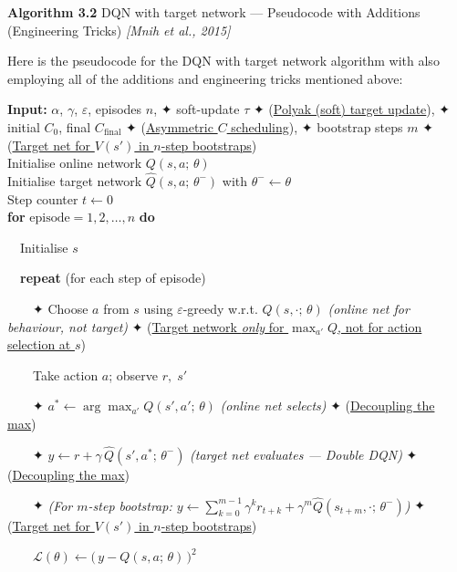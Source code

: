\documentclass[11pt]{article}
\begin{document}
    \begin{pseudobox}

\textbf{Algorithm 3.2} DQN with target network --- Pseudocode with
Additions (Engineering Tricks) \emph{{[}Mnih et al., 2015{]}}

\tcbline

Here is the pseudocode for the DQN with target network algorithm with
also employing all of the additions and engineering tricks mentioned
above:

\textbf{Input:} \(\alpha\), \(\gamma\), \(\varepsilon\), episodes \(n\),
✦ soft-update \(\tau\) ✦ (\hyperref[trick-3-2-1]{Polyak (soft) target
update}), ✦ initial \(C_0\), final \(C_\text{final}\) ✦
(\hyperref[trick-3-2-3]{Asymmetric \(C\) scheduling}), ✦ bootstrap steps
\(m\) ✦ (\hyperref[trick-3-2-5]{Target net for \(V(s')\) in \(n\)-step
bootstraps})\\
Initialise online network \(Q(s, a;\, \theta)\)\\
Initialise target network \(\hat{Q}(s, a;\, \theta^{-})\) with
\(\theta^{-} \leftarrow \theta\)\\
Step counter \(t \leftarrow 0\)\\
\textbf{for} \(\text{episode} = 1, 2, \ldots, n\) \textbf{do}\\
\strut ~~Initialise \(s\)\\
\strut ~~\textbf{repeat} (for each step of episode)\\
\strut ~~~~✦ Choose \(a\) from \(s\) using \(\varepsilon\)-greedy w.r.t.
\(Q(s, \cdot;\, \theta)\) \emph{(online net for behaviour, not target)}
✦ (\hyperref[trick-3-2-2]{Target network \emph{only} for
\(\max_{a'} Q\), not for action selection at \(s\)})\\
\strut ~~~~Take action \(a\); observe \(r,\; s'\)\\
\strut ~~~~✦ \(a^* \leftarrow \arg\max_{a'} Q(s', a';\, \theta)\)
\emph{(online net selects)} ✦ (\hyperref[trick-3-2-4]{Decoupling the
max})\\
\strut ~~~~✦
\(y \leftarrow r + \gamma\, \hat{Q}(s', a^*;\, \theta^{-})\)
\emph{(target net evaluates --- Double DQN)} ✦
(\hyperref[trick-3-2-4]{Decoupling the max})\\
\strut ~~~~✦ \emph{(For \(m\)-step bootstrap:
\(y \leftarrow \sum_{k=0}^{m-1}\gamma^k r_{t+k} + \gamma^m \hat{Q}(s_{t+m}, \cdot;\, \theta^{-})\))}
✦ (\hyperref[trick-3-2-5]{Target net for \(V(s')\) in \(n\)-step
bootstraps})\\
\strut ~~~~\(\mathcal{L}(\theta) \leftarrow \bigl(\, y - Q(s, a;\, \theta) \,\bigr)^{2}\)\\

\end{pseudobox}
\end{document}
